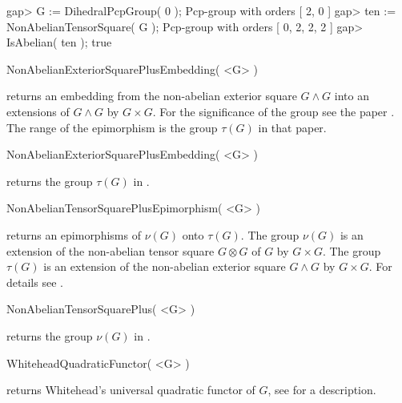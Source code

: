 gap> G := DihedralPcpGroup( 0 );
Pcp-group with orders [ 2, 0 ]
gap> ten := NonAbelianTensorSquare( G );
Pcp-group with orders [ 0, 2, 2, 2 ]
gap> IsAbelian( ten );
true
\endexample

\>NonAbelianExteriorSquarePlusEmbedding( <G> )

returns an embedding from  the non-abelian exterior square $G\wedge G$
into  an  extensions   of  $G\wedge  G$  by  $G\times   G$.   For  the
significance  of the  group  see the  paper \cite{EickNickel07}.   The
range of the epimorphism is the group $\tau(G)$ in that paper.

\>NonAbelianExteriorSquarePlusEmbedding( <G> )

returns the group $\tau(G)$ in \cite{EickNickel07}.

\>NonAbelianTensorSquarePlusEpimorphism( <G> )

returns  an  epimorphisms  of  $\nu(G)$  onto  $\tau(G)$.   The  group
$\nu(G)$ is an extension of the non-abelian tensor square $G\otimes G$
of $G$  by $G\times G$.   The group $\tau(G)$  is an extension  of the
non-abelian exterior  square $G\wedge G$ by $G\times  G$.  For details
see \cite{EickNickel07}.

\>NonAbelianTensorSquarePlus( <G> )

returns the group $\nu(G)$ in \cite{EickNickel07}.


\> WhiteheadQuadraticFunctor( <G> )

returns Whitehead's universal quadratic functor of $G$, see
\cite{EickNickel07} for a description.

